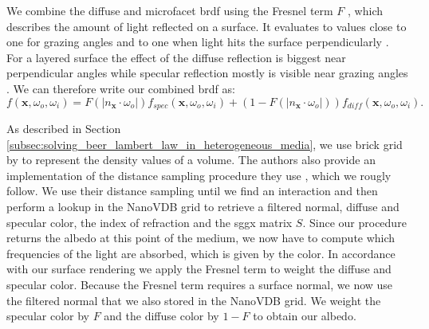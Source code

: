 We combine the diffuse and microfacet \ac{brdf} using the Fresnel term $F$ \cite{fresnel}, which describes the amount of light reflected on a surface.
It evaluates to values close to one for grazing angles and to one when light hits the surface perpendicularly \cite{pbr}.
For a layered surface the effect of the diffuse reflection is biggest near perpendicular angles while specular reflection mostly is visible near grazing angles \cite{pbr}.
We can therefore write our combined \ac{brdf} as:
\begin{equation*}
    f(\boldsymbol{x}, \omega_o, \omega_i) = F(|n_{\boldsymbol{x}} \cdot \omega_o|)f_{spec}(\boldsymbol{x}, \omega_o, \omega_i) + (1 - F(|n_{\boldsymbol{x}} \cdot \omega_o|))f_{diff}(\boldsymbol{x}, \omega_o, \omega_i).
\end{equation*}

As described in Section \ref{subsec:solving_beer_lambert_law_in_heterogeneous_media}, we use brick grid by \citeauthor{brick_grid} \cite{brick_grid} to represent the density values of a volume.
The authors also provide an implementation of the distance sampling procedure they use \cite{brick_grid}, which we rougly follow.
We use their distance sampling until we find an interaction and then perform a lookup in the NanoVDB grid to retrieve a filtered normal, diffuse and specular color, the index of refraction and the \ac{sggx} matrix $S$.
Since our procedure returns the albedo at this point of the medium, we now have to compute which frequencies of the light are absorbed, which is given by the color.
In accordance with our surface rendering we apply the Fresnel term to weight the diffuse and specular color.
Because the Fresnel term requires a surface normal, we now use the filtered normal that we also stored in the NanoVDB grid.
We weight the specular color by $F$ and the diffuse color by $1-F$ to obtain our albedo.

